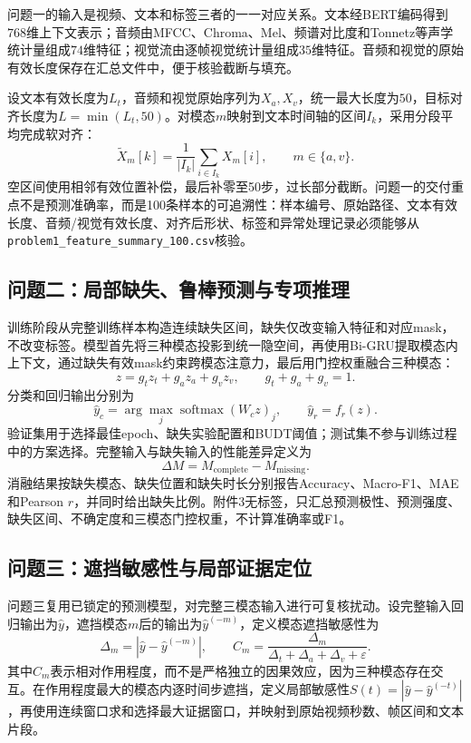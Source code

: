 问题一的输入是视频、文本和标签三者的一一对应关系。文本经BERT编码得到$768$维上下文表示；音频由MFCC、Chroma、Mel、频谱对比度和Tonnetz等声学统计量组成$74$维特征；视觉流由逐帧视觉统计量组成$35$维特征。音频和视觉的原始有效长度保存在汇总文件中，便于核验截断与填充。

设文本有效长度为$L_t$，音频和视觉原始序列为$X_a,X_v$，统一最大长度为$50$，目标对齐长度为$L=\min(L_t,50)$。对模态$m$映射到文本时间轴的区间$I_k$，采用分段平均完成软对齐：
\begin{equation}
\widetilde X_m[k]=\frac{1}{|I_k|}\sum_{i\in I_k}X_m[i],\qquad m\in\{a,v\}.
\end{equation}
空区间使用相邻有效位置补偿，最后补零至50步，过长部分截断。问题一的交付重点不是预测准确率，而是100条样本的可追溯性：样本编号、原始路径、文本有效长度、音频/视觉有效长度、对齐后形状、标签和异常处理记录必须能够从\texttt{problem1\_feature\_summary\_100.csv}核验。

\subsection{问题二：局部缺失、鲁棒预测与专项推理}

训练阶段从完整训练样本构造连续缺失区间，缺失仅改变输入特征和对应mask，不改变标签。模型首先将三种模态投影到统一隐空间，再使用Bi-GRU提取模态内上下文，通过缺失有效mask约束跨模态注意力，最后用门控权重融合三种模态：
\begin{equation}
z=g_tz_t+g_az_a+g_vz_v,\qquad g_t+g_a+g_v=1.
\end{equation}
分类和回归输出分别为
\begin{equation}
\widehat y_c=\arg\max_j\operatorname{softmax}(W_cz)_j,\qquad \widehat y_r=f_r(z).
\end{equation}
验证集用于选择最佳epoch、缺失实验配置和BUDT阈值；测试集不参与训练过程中的方案选择。完整输入与缺失输入的性能差异定义为
\begin{equation}
\Delta M=M_{\mathrm{complete}}-M_{\mathrm{missing}}.
\end{equation}
消融结果按缺失模态、缺失位置和缺失时长分别报告Accuracy、Macro-F1、MAE和Pearson $r$，并同时给出缺失比例。附件3无标签，只汇总预测极性、预测强度、缺失区间、不确定度和三模态门控权重，不计算准确率或F1。

\subsection{问题三：遮挡敏感性与局部证据定位}

问题三复用已锁定的预测模型，对完整三模态输入进行可复核扰动。设完整输入回归输出为$\widehat y$，遮挡模态$m$后的输出为$\widehat y^{(-m)}$，定义模态遮挡敏感性为
\begin{equation}
\Delta_m=|\widehat y-\widehat y^{(-m)}|,\qquad C_m=\frac{\Delta_m}{\Delta_t+\Delta_a+\Delta_v+\varepsilon}.
\end{equation}
其中$C_m$表示相对作用程度，而不是严格独立的因果效应，因为三种模态存在交互。在作用程度最大的模态内逐时间步遮挡，定义局部敏感性$S(t)=|\widehat y-\widehat y^{(-t)}|$，再使用连续窗口求和选择最大证据窗口，并映射到原始视频秒数、帧区间和文本片段。

